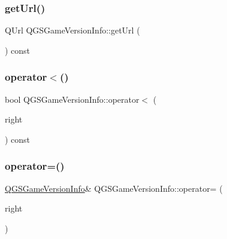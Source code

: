 \mbox{\label{class_q_g_s_game_version_info_a1f2fa243f274baf7819f16c79c9cf401}} 
\subsubsection{\texorpdfstring{get\+Url()}{getUrl()}}
{\footnotesize\ttfamily Q\+Url Q\+G\+S\+Game\+Version\+Info\+::get\+Url (\begin{DoxyParamCaption}{ }\end{DoxyParamCaption}) const}

\mbox{\label{class_q_g_s_game_version_info_a6a6092517cab6ac578630e0a3e95bc70}} 
\subsubsection{\texorpdfstring{operator$<$()}{operator<()}}
{\footnotesize\ttfamily bool Q\+G\+S\+Game\+Version\+Info\+::operator$<$ (\begin{DoxyParamCaption}\item[{const \mbox{\hyperlink{class_q_g_s_game_version_info}{Q\+G\+S\+Game\+Version\+Info}} \&}]{right }\end{DoxyParamCaption}) const}

\mbox{\label{class_q_g_s_game_version_info_a28b7669a3daedffd2a9b3d9120ee983a}} 
\subsubsection{\texorpdfstring{operator=()}{operator=()}\hspace{0.1cm}{\footnotesize\ttfamily [1/2]}}
{\footnotesize\ttfamily \mbox{\hyperlink{class_q_g_s_game_version_info}{Q\+G\+S\+Game\+Version\+Info}}\& Q\+G\+S\+Game\+Version\+Info\+::operator= (\begin{DoxyParamCaption}\item[{const \mbox{\hyperlink{class_q_g_s_game_version_info}{Q\+G\+S\+Game\+Version\+Info}} \&}]{right }\end{DoxyParamCaption})\hspace{0.3cm}{\ttfamily [default]}}

